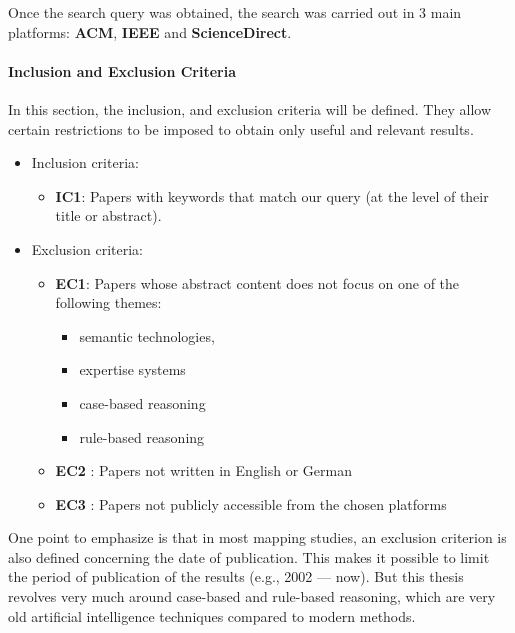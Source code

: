             Once the search query was obtained, the search was carried out in 3 main platforms: \textbf{ACM}, \textbf{IEEE} and \textbf{ScienceDirect}. 


            \paragraph{Inclusion and Exclusion Criteria}
            In this section, the inclusion, and exclusion criteria will be defined. They allow certain restrictions to be imposed to obtain only useful and relevant results.

            \begin{itemize}
                \item Inclusion criteria:
                    \begin{itemize}
                        \item \textbf{IC1}: Papers with keywords that match our query (at the level of their title or abstract).
                    \end{itemize}

                \item Exclusion criteria:
                    \begin{itemize}
                        \item \textbf{EC1\label{EC1}}: Papers whose abstract content does not focus on one of the following themes:
                            \begin{itemize}
                                \item semantic technologies,
                                \item expertise systems
                                \item case-based reasoning
                                \item rule-based reasoning
                            \end{itemize}

                        \item \textbf{EC2\label{EC2}} : Papers not written in English or German

                        \item \textbf{EC3\label{EC3}} : Papers not publicly accessible from the chosen platforms
                    \end{itemize}
            \end{itemize}

            One point to emphasize is that in most mapping studies, an exclusion criterion is also defined concerning the date of publication. This makes it possible to limit the period of publication of the results (e.g., 2002 — now). But this thesis revolves very much around case-based and rule-based reasoning, which are very old artificial intelligence techniques compared to modern methods.

